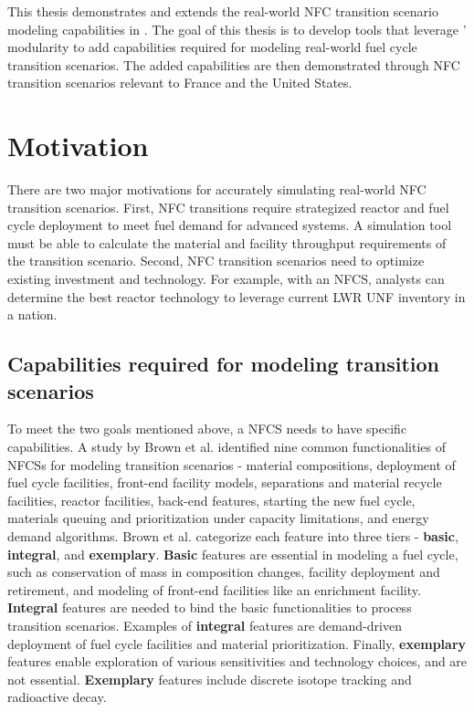 This thesis demonstrates and extends the real-world \gls{NFC} transition
scenario modeling capabilities in \Cyclus. 
The goal of this thesis is to
develop tools that leverage \Cyclus' modularity to
add capabilities required for modeling real-world
fuel cycle transition scenarios. The added capabilities are then
demonstrated through \gls{NFC} transition scenarios relevant to France and the United
States.

\section{Motivation}

There are two major motivations for accurately simulating
real-world \gls{NFC} transition scenarios.
First, \gls{NFC} transitions require strategized reactor
and fuel cycle deployment to meet fuel demand for advanced systems.
A simulation tool must be able to calculate the material
and facility throughput requirements of the transition scenario.
Second, \gls{NFC} transition scenarios need to optimize
existing investment and technology. For example, with an \gls{NFCS},
analysts can determine the best reactor technology
to leverage current \gls{LWR} \gls{UNF} inventory in a nation.


\subsection{Capabilities required for modeling transition scenarios}
To meet the two goals mentioned above, a \gls{NFCS} needs to have
specific capabilities.
A study by Brown et al. \cite{brown_identification_2016}
identified nine common functionalities of \glspl{NFCS} for modeling
transition scenarios - material compositions, deployment of fuel
cycle facilities, front-end facility models, separations and material
recycle facilities, reactor facilities, back-end features, starting
the new fuel cycle, materials queuing and prioritization under
capacity limitations, and energy demand algorithms. Brown et al.
categorize each feature into three tiers - \textbf{basic}, \textbf{integral},
and \textbf{exemplary}. \textbf{Basic} features are essential in modeling a fuel
cycle, such as conservation of mass in composition changes,
facility deployment and retirement, and modeling of front-end
facilities like an enrichment facility.
\textbf{Integral} features are
needed to bind the basic functionalities to process
transition scenarios. Examples of \textbf{integral} features are
demand-driven deployment of fuel cycle facilities and
material prioritization.
Finally, \textbf{exemplary} features enable exploration
of various sensitivities and technology choices, and are
not essential. \textbf{Exemplary} features include discrete isotope
tracking and radioactive decay.


